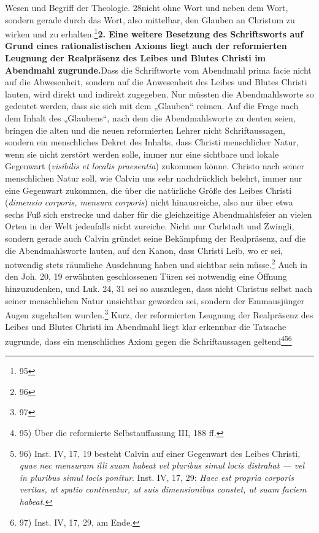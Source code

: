 Wesen und Begriff der Theologie. 28nicht ohne Wort und neben dem Wort, sondern gerade durch das Wort, also mittelbar, den Glauben an Christum zu wirken und zu erhalten.\footnote{95}\noindent \textbf{2. Eine weitere Besetzung des Schriftsworts auf Grund eines rationalistischen Axioms liegt auch der reformierten Leugnung der Realpräsenz des Leibes und Blutes Christi im Abendmahl zugrunde.}Dass die Schriftworte vom Abendmahl prima facie nicht auf die Abwesenheit, sondern auf die Anwesenheit des Leibes und Blutes Christi lauten, wird direkt und indirekt zugegeben. Nur müssten die Abendmahlsworte so gedeutet werden, dass sie sich mit dem „Glauben“ reimen. Auf die Frage nach dem Inhalt des „Glaubens“, nach dem die Abendmahlsworte zu deuten seien, bringen die alten und die neuen reformierten Lehrer nicht Schriftaussagen, sondern ein menschliches Dekret des Inhalts, dass Christi menschlicher Natur, wenn sie nicht zerstört werden solle, immer nur eine sichtbare und lokale Gegenwart (\textit{visibilis et localis praesentia}) zukommen könne. Christo nach seiner menschlichen Natur soll, wie Calvin uns sehr nachdrücklich belehrt, immer nur eine Gegenwart zukommen, die über die natürliche Größe des Leibes Christi (\textit{dimensio corporis, mensura corporis}) nicht hinausreiche, also nur über etwa sechs Fuß sich erstrecke und daher für die gleichzeitige Abendmahlsfeier an vielen Orten in der Welt jedenfalls nicht zureiche. Nicht nur Carlstadt und Zwingli, sondern gerade auch Calvin gründet seine Bekämpfung der Realpräsenz, auf die die Abendmahlsworte lauten, auf den Kanon, dass Christi Leib, wo er sei, notwendig stets räumliche Ausdehnung haben und sichtbar sein müsse.\footnote{96} Auch in den Joh. 20, 19 erwähnten geschlossenen Türen sei notwendig eine Öffnung hinzuzudenken, und Luk. 24, 31 sei so auszulegen, dass nicht Christus selbst nach seiner menschlichen Natur unsichtbar geworden sei, sondern der Emmausjünger Augen zugehalten wurden.\footnote{97} Kurz, der reformierten Leugnung der Realpräsenz des Leibes und Blutes Christi im Abendmahl liegt klar erkennbar die Tatsache zugrunde, dass ein menschliches Axiom gegen die Schriftaussagen geltend\footnote{95) Über die reformierte Selbstauffassung III, 188 ff.}\footnote{96) Inst. IV, 17, 19 besteht Calvin auf einer Gegenwart des Leibes Christi, \textit{quae nec mensuram illi suam habeat vel pluribus simul locis distrahat --- vel in pluribus simul locis ponitur}. Inst. IV, 17, 29: \textit{Haec est propria corporis veritas, ut spatio contineatur, ut suis dimensionibus constet, ut suam faciem habeat.}}\footnote{97) Inst. IV, 17, 29, am Ende.}